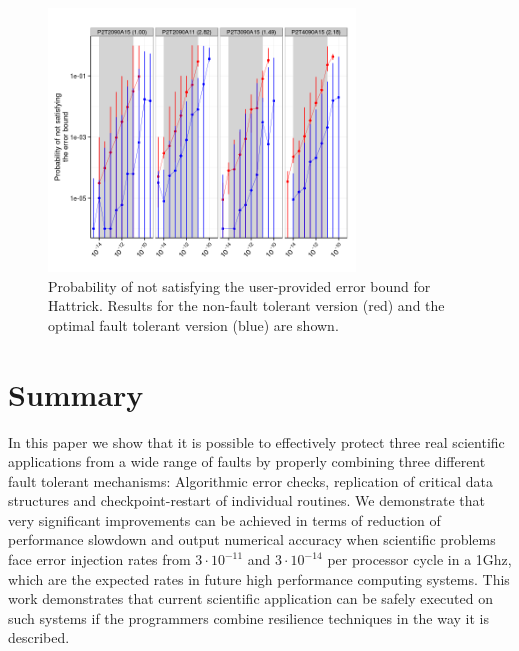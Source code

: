 \documentclass{sig-alternate}
\begin{document}
\begin{figure}[ht!]
\centering
\includegraphics[height=2.75in]{figs/Hattrick_ImperfectRate_log.png}
\caption{Probability of not satisfying the user-provided error bound for Hattrick. Results for the non-fault tolerant version (red) and the optimal fault tolerant version (blue) are shown.}
\label{fig:Hattrick_ImperfectRate}
\end{figure}



\section{Summary}
\label{sec:summary}

In this paper we show that it is possible to effectively protect three real scientific applications from a wide range of faults by properly combining three different fault tolerant mechanisms:
Algorithmic error checks, replication of critical data structures and checkpoint-restart of individual routines.
We demonstrate that very significant improvements can be achieved in terms of reduction of performance slowdown and output numerical accuracy when scientific problems face error injection rates from $3 \cdot 10^{-11}$ and $3 \cdot 10^{-14}$ per processor cycle in a 1Ghz, which are the expected rates in future high performance computing systems.
This work demonstrates that current scientific application can be safely executed on such systems if the programmers combine resilience techniques in the way it is described.



\end{document}
